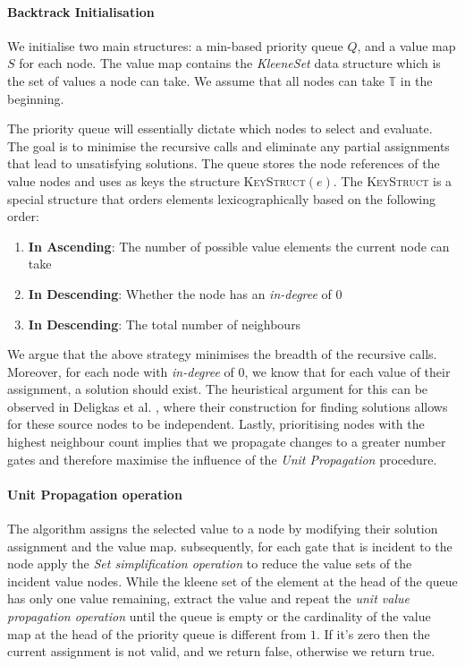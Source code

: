 \paragraph*{Backtrack Initialisation} We initialise two main structures:
a min-based priority queue $Q$, and a value map $S$ for each node.
The value map contains the \textit{KleeneSet} data structure
which is the set of values a node can take. We assume that all nodes
can take $\mathbb{T}$ in the beginning.


The priority queue will essentially dictate
which nodes to select and evaluate.
The goal is to minimise the recursive calls and eliminate any partial assignments
that lead to unsatisfying solutions.
The queue stores the node references of the value nodes
and uses as keys the structure \textsc{KeyStruct}$(e)$.
The \textsc{KeyStruct} is a special structure that orders elements lexicographically
based on the following order:
\begin{enumerate}
    \item \textbf{In Ascending}: The number of possible value elements the current node can take
    \item \textbf{In Descending}: Whether the node has an \textit{in-degree} of $0$
    \item \textbf{In Descending}: The total number of neighbours
\end{enumerate}
We argue that the above strategy minimises the breadth of the recursive calls. Moreover,
for each node with \textit{in-degree} of $0$, we know that for each value of their assignment, a solution should exist.
The heuristical argument for this can be observed in Deligkas et al. \cite{deligkas_PureCircuitTightInapproximability_2024},
where their construction for finding solutions allows for these source nodes to be independent.
Lastly, prioritising nodes with the highest neighbour count implies that we
propagate changes to a greater number gates and therefore maximise the influence of the \textit{Unit Propagation}
procedure.

\paragraph*{Unit Propagation operation}
The algorithm assigns the selected value to a node
by modifying their solution assignment and the value map.
subsequently, for each gate that is incident to the node apply the \textit{Set simplification operation}
to reduce the value sets of the incident value nodes.
While the kleene set of the element at the head of the queue
has only one value remaining, extract the value and repeat the \textit{unit value propagation operation}
until the queue is empty or the cardinality of the value map at the head of the priority queue
is different from $1$. If it's zero then the
current assignment is not valid, and we return false, otherwise we return true.


